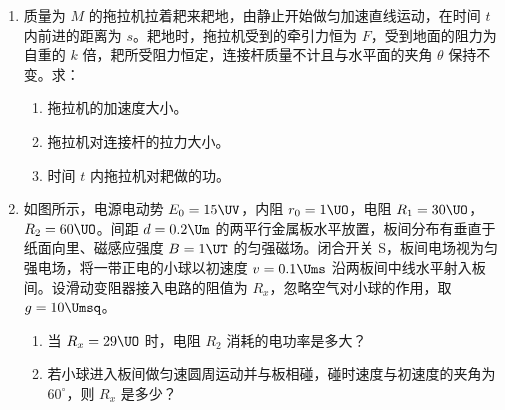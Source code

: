 \documentclass[\gkver]{gaokaozhenti}
\begin{document}
\begin{enumerate}
\item
质量为 $M$ 的拖拉机拉着耙来耙地，由静止开始做匀加速直线运动，在时间 $t$ 内前进的距离为 $s$。耙地时，拖拉机受到的牵引力恒为 $F$，受到地面的阻力为自重的 $k$ 倍，耙所受阻力恒定，连接杆质量不计且与水平面的夹角 $\theta$ 保持不变。求：
\begin{enumerate}
	\item
	拖拉机的加速度大小。
	\item
	拖拉机对连接杆的拉力大小。
	\item
	时间 $t$ 内拖拉机对耙做的功。
\end{enumerate}


\item
如图所示，电源电动势 $E_{0}=15\UV$，内阻 $r_{0}=1\UO$，电阻 $R_{1}=30\UO$，$R_{2}=60\UO$。间距 $d=0.2\Um$ 的两平行金属板水平放置，板间分布有垂直于纸面向里、磁感应强度 $B=1\UT$ 的匀强磁场。闭合开关 S，板间电场视为匀强电场，将一带正电的小球以初速度 $v=0.1\Ums$ 沿两板间中线水平射入板间。设滑动变阻器接入电路的阻值为 $R_{x}$，忽略空气对小球的作用，取 $g=10\Umsq$。
\begin{enumerate}
	\item
	当 $R_{x}=29\UO$ 时，电阻 $R_{2}$ 消耗的电功率是多大？
	\item
	若小球进入板间做匀速圆周运动并与板相碰，碰时速度与初速度的夹角为 $60^{\circ}$，则 $R_{x}$ 是多少？
\end{enumerate}


\end{enumerate}
\end{document}
